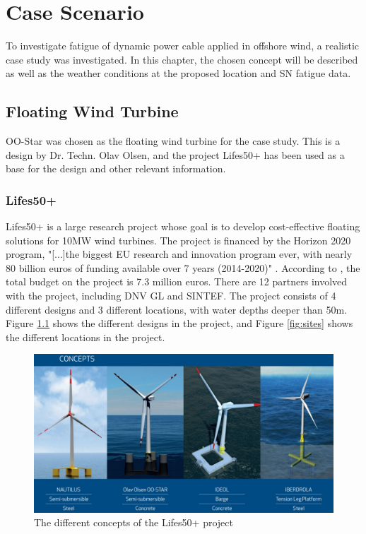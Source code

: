 \chapter{Case Scenario}
To investigate fatigue of dynamic power cable applied in offshore wind, a realistic case study was investigated. In this chapter, the chosen concept will be described as well as the weather conditions at the proposed location and SN fatigue data. 
\section{Floating Wind Turbine}
OO-Star was chosen as the floating wind turbine for the case study. This is a design by Dr. Techn. Olav Olsen, and the project Lifes50+ has been used as a base for the design and other relevant information. 
\subsection{Lifes50+}
Lifes50+ is a large research project whose goal is to develop cost-effective floating solutions for 10MW wind turbines. The project is financed by the Horizon 2020 program, "[...]the biggest EU research and innovation program ever, with nearly 80 billion euros of funding available over 7 years (2014-2020)" \cite{Horizon2010}. According to \cite{Olavolsen}, the total budget on the project is 7.3 million euros. There are 12 partners involved with the project, including DNV GL and SINTEF. The project consists of 4 different designs and 3 different locations, with water depths deeper than 50m. Figure \ref{fig:concept} shows the different designs in the project, and Figure \ref{fig:sites} shows the different locations in the project. 

\begin{figure}[H]
\centering
\includegraphics[scale=0.4]{figures/concepts}
\caption[$\; \:$Concepts of the Lifes50+ project]{The different concepts of the Lifes50+ project \cite{Lifes50+} }
 \label{fig:concept}
\end{figure}

